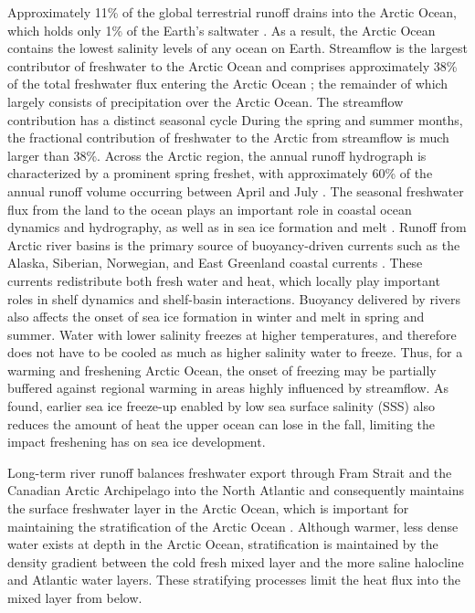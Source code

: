\documentclass[jgrga, draft]{agutex}
\begin{document}
\begin{article}
Approximately 11\% of the global terrestrial runoff drains into the Arctic Ocean, which holds only 1\% of the Earth's saltwater \citep{Lewis_2000,Lammers_2001}.
As a result, the Arctic Ocean contains the lowest salinity levels of any ocean on Earth.
Streamflow is the largest contributor of freshwater to the Arctic Ocean and comprises approximately 38\% of the total freshwater flux entering the Arctic Ocean \citep{Serreze_2006}; the remainder of which largely consists of precipitation over the Arctic Ocean.
The streamflow contribution has a distinct seasonal cycle
During the spring and summer months, the fractional contribution of freshwater to the Arctic from streamflow is much larger than 38\%.
Across the Arctic region, the annual runoff hydrograph is characterized by a prominent spring freshet, with approximately 60\% of the annual runoff volume occurring between April and July \citep{Lammers_2001}.
The seasonal freshwater flux from the land to the ocean plays an important role in coastal ocean dynamics and hydrography, as well as in sea ice formation and melt \citep{Rabe_2011,Fichot_2013}.
Runoff from Arctic river basins is the primary source of buoyancy-driven currents such as the Alaska, Siberian, Norwegian, and East Greenland coastal currents \citep[e.g.][]{Morison_2000,Boyd_2002,McGeehan_2012}.
These currents redistribute both fresh water and heat, which locally play important roles in shelf dynamics and shelf-basin interactions.
Buoyancy delivered by rivers also affects the onset of sea ice formation in winter and melt in spring and summer.
Water with lower salinity freezes at higher temperatures, and therefore does not have to be cooled as much as higher salinity water to freeze.
Thus, for a warming and freshening Arctic Ocean, the onset of freezing may be partially buffered against regional warming in areas highly influenced by streamflow.
As \citet{Morison_2012} found, earlier sea ice freeze-up enabled by low sea surface salinity (SSS) also reduces the amount of heat the upper ocean can lose in the fall, limiting the impact freshening has on sea ice development.

Long-term river runoff balances freshwater export through Fram Strait and the Canadian Arctic Archipelago into the North Atlantic and consequently maintains the surface freshwater layer in the Arctic Ocean, which is important for maintaining the stratification of the Arctic Ocean \citep{Nummelin_2015}.
Although warmer, less dense water exists at depth in the Arctic Ocean, stratification is maintained by the density gradient between the cold fresh mixed layer and the more saline halocline and Atlantic water layers.
These stratifying processes limit the heat flux into the mixed layer from below.


\end{article}
\end{document}
